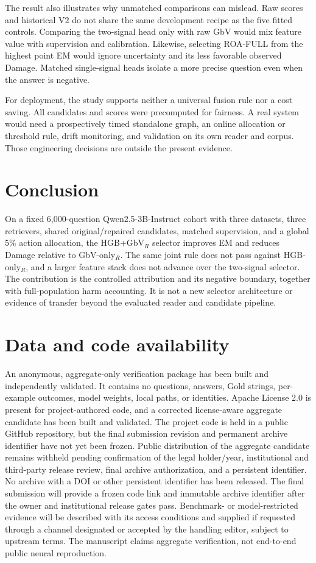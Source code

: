\documentclass[11pt]{article}
\begin{document}
The result also illustrates why unmatched comparisons can mislead. Raw scores and historical V2 do not share the same development recipe as the five fitted controls. Comparing the two-signal head only with raw GbV would mix feature value with supervision and calibration. Likewise, selecting ROA-FULL from the highest point EM would ignore uncertainty and its less favorable observed Damage. Matched single-signal heads isolate a more precise question even when the answer is negative.

For deployment, the study supports neither a universal fusion rule nor a cost saving. All candidates and scores were precomputed for fairness. A real system would need a prospectively timed standalone graph, an online allocation or threshold rule, drift monitoring, and validation on its own reader and corpus. Those engineering decisions are outside the present evidence.

\section{Conclusion}
On a fixed 6,000-question Qwen2.5-3B-Instruct cohort with three datasets, three retrievers, shared original/repaired candidates, matched supervision, and a global 5\% action allocation, the HGB+\allowbreak GbV$_R$ selector improves EM and reduces Damage relative to GbV-\allowbreak only$_R$. The same joint rule does not pass against HGB-\allowbreak only$_R$, and a larger feature stack does not advance over the two-signal selector. The contribution is the controlled attribution and its negative boundary, together with full-population harm accounting. It is not a new selector architecture or evidence of transfer beyond the evaluated reader and candidate pipeline.

\section*{Data and code availability}
An anonymous, aggregate-only verification package has been built and independently validated. It contains no questions, answers, Gold strings, per-example outcomes, model weights, local paths, or identities. Apache License 2.0 is present for project-authored code, and a corrected license-aware aggregate candidate has been built and validated. The project code is held in a public GitHub repository, but the final submission revision and permanent archive identifier have not yet been frozen. Public distribution of the aggregate candidate remains withheld pending confirmation of the legal holder/year, institutional and third-party release review, final archive authorization, and a persistent identifier. No archive with a DOI or other persistent identifier has been released. The final submission will provide a frozen code link and immutable archive identifier after the owner and institutional release gates pass. Benchmark- or model-restricted evidence will be described with its access conditions and supplied if requested through a channel designated or accepted by the handling editor, subject to upstream terms. The manuscript claims aggregate verification, not end-to-end public neural reproduction.
\end{document}
